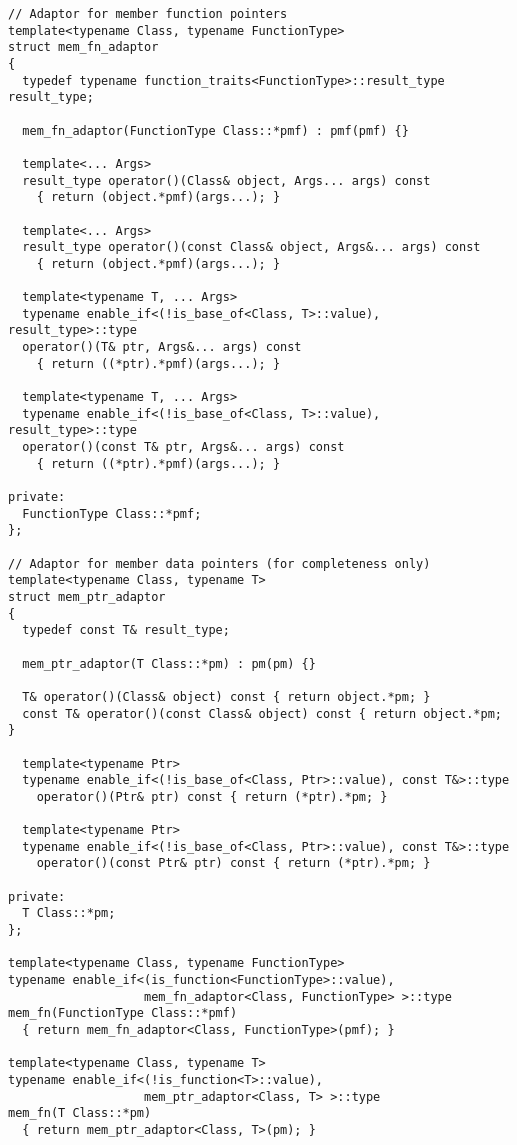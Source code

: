 \documentclass{article}
\begin{document}
\small
\begin{verbatim}
// Adaptor for member function pointers
template<typename Class, typename FunctionType>
struct mem_fn_adaptor
{
  typedef typename function_traits<FunctionType>::result_type result_type;

  mem_fn_adaptor(FunctionType Class::*pmf) : pmf(pmf) {}
  
  template<... Args>
  result_type operator()(Class& object, Args... args) const
    { return (object.*pmf)(args...); }

  template<... Args>
  result_type operator()(const Class& object, Args&... args) const
    { return (object.*pmf)(args...); }

  template<typename T, ... Args>
  typename enable_if<(!is_base_of<Class, T>::value), result_type>::type
  operator()(T& ptr, Args&... args) const
    { return ((*ptr).*pmf)(args...); }

  template<typename T, ... Args>
  typename enable_if<(!is_base_of<Class, T>::value), result_type>::type
  operator()(const T& ptr, Args&... args) const
    { return ((*ptr).*pmf)(args...); }

private:
  FunctionType Class::*pmf;
};

// Adaptor for member data pointers (for completeness only)
template<typename Class, typename T>
struct mem_ptr_adaptor
{
  typedef const T& result_type;

  mem_ptr_adaptor(T Class::*pm) : pm(pm) {}

  T& operator()(Class& object) const { return object.*pm; }
  const T& operator()(const Class& object) const { return object.*pm; }

  template<typename Ptr> 
  typename enable_if<(!is_base_of<Class, Ptr>::value), const T&>::type
    operator()(Ptr& ptr) const { return (*ptr).*pm; }

  template<typename Ptr> 
  typename enable_if<(!is_base_of<Class, Ptr>::value), const T&>::type
    operator()(const Ptr& ptr) const { return (*ptr).*pm; }

private:
  T Class::*pm;
};

template<typename Class, typename FunctionType>
typename enable_if<(is_function<FunctionType>::value), 
                   mem_fn_adaptor<Class, FunctionType> >::type
mem_fn(FunctionType Class::*pmf)
  { return mem_fn_adaptor<Class, FunctionType>(pmf); }

template<typename Class, typename T>
typename enable_if<(!is_function<T>::value), 
                   mem_ptr_adaptor<Class, T> >::type
mem_fn(T Class::*pm)
  { return mem_ptr_adaptor<Class, T>(pm); }
\end{verbatim}
\normalsize 
\end{document}
